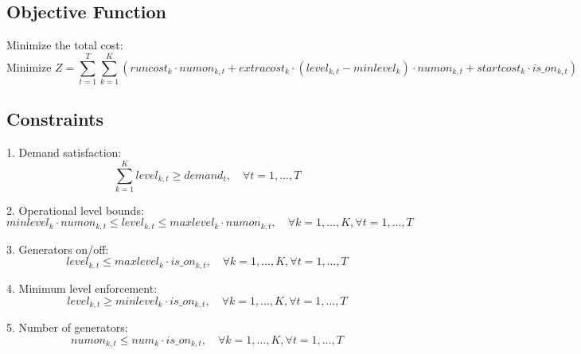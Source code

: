 \documentclass{article}
\begin{document}
\subsection*{Objective Function}

Minimize the total cost:
\[
\text{Minimize } Z = \sum_{t=1}^{T} \sum_{k=1}^{K} \left( runcost_{k} \cdot numon_{k,t} + extracost_{k} \cdot (level_{k,t} - minlevel_{k}) \cdot numon_{k,t} + startcost_{k} \cdot is\_on_{k,t} \right)
\]

\subsection*{Constraints}

1. Demand satisfaction:
\[
\sum_{k=1}^{K} level_{k,t} \geq demand_{t}, \quad \forall t = 1,\ldots,T
\]

2. Operational level bounds:
\[
minlevel_{k} \cdot numon_{k,t} \leq level_{k,t} \leq maxlevel_{k} \cdot numon_{k,t}, \quad \forall k = 1,\ldots,K, \forall t = 1,\ldots,T
\]

3. Generators on/off:
\[
level_{k,t} \leq maxlevel_{k} \cdot is\_on_{k,t}, \quad \forall k = 1,\ldots,K, \forall t = 1,\ldots,T
\]

4. Minimum level enforcement:
\[
level_{k,t} \geq minlevel_{k} \cdot is\_on_{k,t}, \quad \forall k = 1,\ldots,K, \forall t = 1,\ldots,T
\]

5. Number of generators:
\[
numon_{k,t} \leq num_{k} \cdot is\_on_{k,t}, \quad \forall k = 1,\ldots,K, \forall t = 1,\ldots,T
\]
\end{document}
